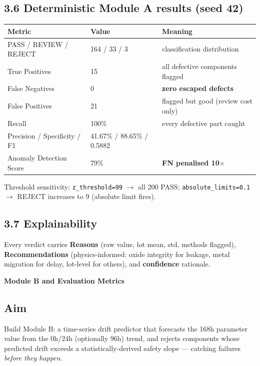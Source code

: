\documentclass[11pt,a4paper]{article}
\newcommand{\code}[1]{\texttt{\small #1}}
\newcommand{\keys}[1]{\textbf{\sffamily#1}}
\newcommand{\phasebox}[3]{\par\vspace{1em}\noindent
  \begin{tcolorbox}[colback=isroblue!6,colframe=isroblue,
    title={\sffamily\bfseries\color{white}#1 \quad [Progress: #2]},arc=2pt,boxrule=1.2pt]
    \textbf{#3}
  \end{tcolorbox}\par\vspace{0.4em}}
\begin{document}
\subsection*{3.6 Deterministic Module A results (seed 42)}
\begin{center}
\begin{tabular}{@{}lll@{}}
\toprule
\textbf{Metric} & \textbf{Value} & \textbf{Meaning}\\
\midrule
PASS / REVIEW / REJECT & 164 / 33 / 3 & classification distribution\\
True Positives & 15 & all defective components flagged\\
False Negatives & 0 & \textbf{zero escaped defects}\\
False Positives & 21 & flagged but good (review cost only)\\
Recall & 100\% & every defective part caught\\
Precision / Specificity / F1 & 41.67\% / 88.65\% / 0.5882 &\\
Anomaly Detection Score & 79\% & \textbf{FN penalised 10$\times$}\\
\bottomrule
\end{tabular}
\end{center}

\noindent Threshold sensitivity: \code{z\_threshold=99} $\rightarrow$ all 200 PASS;
\code{absolute\_limits=0.1} $\rightarrow$ REJECT increases to 9 (absolute limit fires).

\subsection*{3.7 Explainability}
Every verdict carries \keys{Reasons} (raw value, lot mean, std, methods flagged),
\keys{Recommendations} (physics-informed: oxide integrity for leakage, metal migration for
delay, lot-level for others), and \keys{confidence} rationale.

\phasebox{Phase 4}{60\% -- 80\%}{Module B and Evaluation Metrics}

\subsection*{Aim}
Build Module B: a time-series drift predictor that forecasts the 168h parameter value from the
0h/24h (optionally 96h) trend, and rejects components whose predicted drift exceeds a
statistically-derived safety slope --- catching failures \emph{before they happen}.
\end{document}
